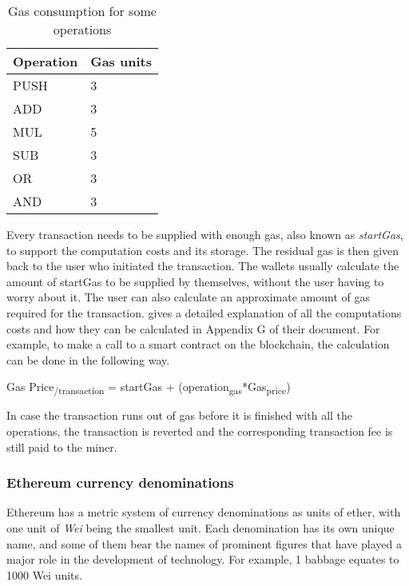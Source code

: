 \documentclass[english]{tktltiki}
\begin{document}
\begin{table}[H]
\centering
\label{gas}
\begin{tabular}{|l|l|}
\hline
\textbf{Operation} & \textbf{Gas units} \\ \hline
PUSH               & 3                           \\ \hline
ADD                & 3                           \\ \hline
MUL                & 5                           \\ \hline
SUB                & 3                           \\ \hline
OR                 & 3                           \\ \hline
AND                & 3                           \\ \hline
\end{tabular}
\caption{Gas consumption for some operations}
\end{table}

Every transaction needs to be supplied with enough gas, also known as \textit{startGas}, to support the computation costs and its storage. The residual gas is then given back to the user who initiated the transaction. The wallets usually calculate the amount of startGas to be supplied by themselves, without the user having to worry about it. The user can also calculate an approximate amount of gas required for the transaction. \cite{ethereum1} gives a detailed explanation of all the computations costs and how they can be calculated in Appendix G of their document. For example, to make a call to a smart contract on the blockchain, the calculation can be done in the following way.

Gas Price\textsubscript{/transaction} = startGas + (operation\textsubscript{gas}*Gas\textsubscript{price})

In case the transaction runs out of gas before it is finished with all the operations, the transaction is reverted and the corresponding transaction fee is still paid to the miner. 

\subsubsection*{Ethereum currency denominations}

Ethereum has a metric system of currency denominations as units of ether, with one unit of \textit{Wei} being the smallest unit. Each denomination has its own unique name, and some of them bear the names of prominent figures that have played a major role in the development of technology. For example, 1 babbage equates to 1000 Wei units.  
\end{document}
